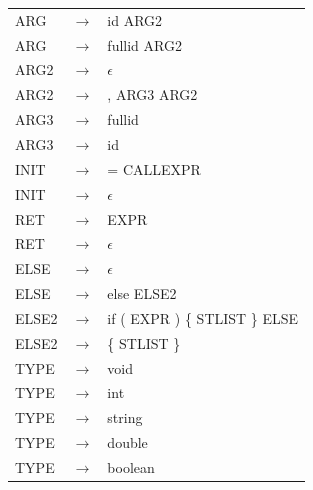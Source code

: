 \documentclass[11pt,a4paper]{article}
\begin{document}
\begin{tabular}{l c l}
		ARG &$\rightarrow$& id ARG2 \\
		ARG &$\rightarrow$& fullid ARG2 \\
		ARG2 &$\rightarrow$& $\epsilon$ \\
		ARG2 &$\rightarrow$& , ARG3 ARG2 \\
		ARG3 &$\rightarrow$& fullid \\
		ARG3 &$\rightarrow$& id \\
		INIT &$\rightarrow$& = CALLEXPR \\
		INIT &$\rightarrow$& $\epsilon$ \\
		RET &$\rightarrow$& EXPR \\
		RET &$\rightarrow$& $\epsilon$ \\
		ELSE &$\rightarrow$& $\epsilon$ \\
		ELSE &$\rightarrow$& else ELSE2 \\
		ELSE2 &$\rightarrow$& if ( EXPR ) \{ STLIST \} ELSE \\
		ELSE2 &$\rightarrow$& \{ STLIST \} \\
		TYPE &$\rightarrow$& void \\
		TYPE &$\rightarrow$& int \\
		TYPE &$\rightarrow$& string \\
		TYPE &$\rightarrow$& double \\
		TYPE &$\rightarrow$& boolean \\
	\end{tabular}
	
	
	\newpage
\end{document}
